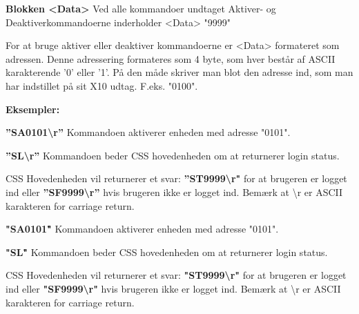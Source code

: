 \textbf{Blokken <Data>}
Ved alle kommandoer undtaget Aktiver- og Deaktiverkommandoerne inderholder <Data> "9999"

For at bruge aktiver eller deaktiver kommandoerne er <Data> formateret som adressen. Denne adressering formateres som 4 byte, som hver består af ASCII karakterende '0' eller '1'. På den måde skriver man blot den adresse ind, som man har indstillet på sit X10 udtag. F.eks. "0100".

\textbf{Eksempler:}

\textbf{''SA0101\textbackslash r''}
Kommandoen aktiverer enheden med adresse "0101".

\textbf{''SL\textbackslash r''}
Kommandoen beder CSS hovedenheden om at returnerer login status.

CSS Hovedenheden vil returnerer et svar:
\textbf{''ST9999\textbackslash r"} for at brugeren er logget ind eller \textbf{''SF9999\textbackslash r''} hvis brugeren ikke er logget ind. Bemærk at \textbackslash r er ASCII karakteren for carriage return.

\textbf{"SA0101\r"}
Kommandoen aktiverer enheden med adresse "0101".

\textbf{"SL\r"}
Kommandoen beder CSS hovedenheden om at returnerer login status.

CSS Hovedenheden vil returnerer et svar:
\textbf{"ST9999\textbackslash r"} for at brugeren er logget ind eller \textbf{"SF9999\textbackslash r"} hvis brugeren ikke er logget ind. Bemærk at \textbackslash r er ASCII karakteren for carriage return.

